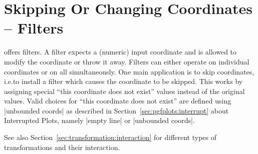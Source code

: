 
\section[reference.coordfiltering]{Skipping Or Changing Coordinates -- Filters}
\label{sec:filters}

\PGFPlots{} offers filters. A filter expects a (numeric) input coordinate and
is allowed to modify the coordinate or throw it away. Filters can either
operate on individual coordinates or on all simultaneously. One main
application is to skip coordinates, i.e.\@ to install a filter which causes the
coordinate to be skipped. This works by assigning special ``this coordinate
does not exist'' values instead of the original values. Valid choices for
``this coordinate does not exist'' are defined using |unbounded coords| as
described in Section~\ref{sec:pgfplots:interrupt} about Interrupted Plots, namely
|empty line| or |unbounded coords|.

See also Section~\ref{sec:transformation:interaction} for different types of
transformations and their interaction.

